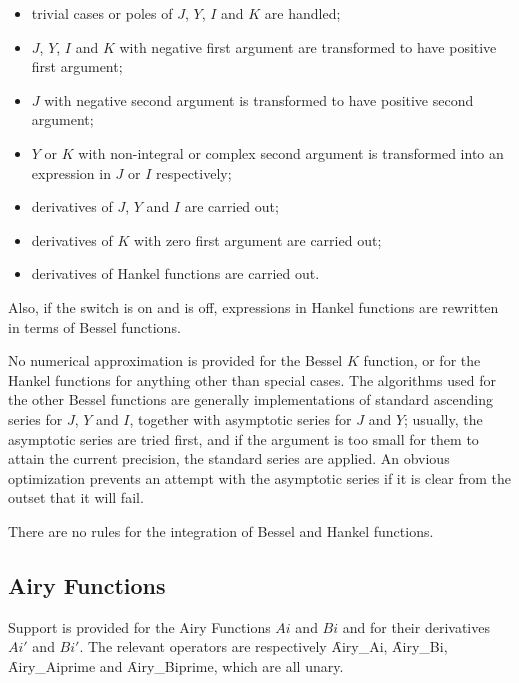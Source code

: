 \begin{itemize}
\item trivial cases or poles of $J$, $Y$, $I$ and $K$ are handled;
\item $J$, $Y$, $I$ and $K$ with negative first argument are transformed to have
positive first argument;
\item $J$ with negative second argument is transformed to have positive second
argument;
\item $Y$ or $K$ with non-integral or complex second argument is transformed
into an expression in $J$ or $I$ respectively;
\item derivatives of $J$, $Y$ and $I$ are carried out;
\item derivatives of $K$ with zero first argument are carried out;
\item derivatives of Hankel functions are carried out.
\end{itemize}
Also, if the  switch is on and
 is off,
expressions in Hankel functions are rewritten in terms of Bessel functions.

No numerical approximation is provided for the Bessel $K$ function, or
for the Hankel functions for anything other than special cases.  The
algorithms used for the other Bessel functions are generally
implementations of standard ascending series for $J$, $Y$ and $I$,
together with asymptotic series for $J$ and $Y$; usually, the
asymptotic series are tried first, and if the argument is too small
for them to attain the current precision, the standard series are
applied.  An obvious optimization prevents an attempt with the
asymptotic series if it is clear from the outset that it will fail.

There are no rules for the integration of Bessel and Hankel functions.

\subsection{Airy Functions}
\hypertarget{operator:AIRY_AI}{}
\hypertarget{operator:AIRY_AIPRIME}{}
\hypertarget{operator:AIRY_BI}{}
\hypertarget{operator:AIRY_BIPRIME}{}
\hypertarget{AIRYF}{}

Support is provided for the Airy Functions $Ai$ and $Bi$ and for their
derivatives $Ai'$ and $Bi'$.  The relevant operators are
respectively \f{Airy\_Ai}, \f{Airy\_Bi}, \f{Airy\_Aiprime} and
\f{Airy\_Biprime}, which are all unary.

